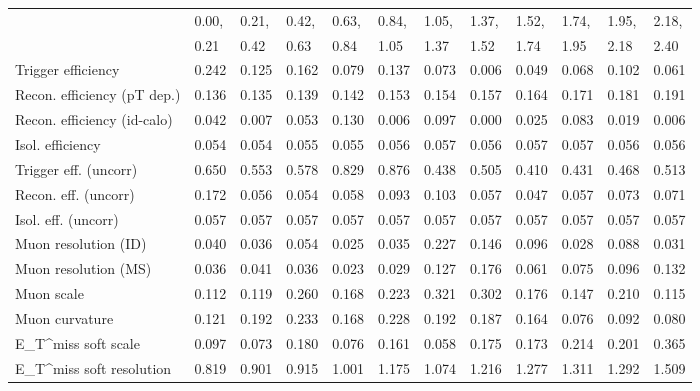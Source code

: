 \begin{tabular}{l|p{0.6cm}p{0.6cm}p{0.6cm}p{0.6cm}p{0.6cm}p{0.6cm}p{0.6cm}p{0.6cm}p{0.6cm}p{0.6cm}p{0.6cm}}
\hline
   & 0.00, & 0.21, & 0.42, & 0.63, & 0.84, & 1.05, & 1.37, & 1.52, & 1.74, & 1.95, & 2.18,  \\ 
   & 0.21 & 0.42 & 0.63 & 0.84 & 1.05 & 1.37 & 1.52 & 1.74 & 1.95 & 2.18 & 2.40  \\ 
\hline
Trigger efficiency                       & 0.242 & 0.125 & 0.162 & 0.079 & 0.137 & 0.073 & 0.006 & 0.049 & 0.068 & 0.102 & 0.061 \\
Recon. efficiency (pT dep.)              & 0.136 & 0.135 & 0.139 & 0.142 & 0.153 & 0.154 & 0.157 & 0.164 & 0.171 & 0.181 & 0.191 \\
Recon. efficiency (id-calo)              & 0.042 & 0.007 & 0.053 & 0.130 & 0.006 & 0.097 & 0.000 & 0.025 & 0.083 & 0.019 & 0.006 \\
Isol. efficiency                         & 0.054 & 0.054 & 0.055 & 0.055 & 0.056 & 0.057 & 0.056 & 0.057 & 0.057 & 0.056 & 0.056 \\
Trigger eff. (uncorr)                    & 0.650 & 0.553 & 0.578 & 0.829 & 0.876 & 0.438 & 0.505 & 0.410 & 0.431 & 0.468 & 0.513 \\
Recon. eff. (uncorr)                     & 0.172 & 0.056 & 0.054 & 0.058 & 0.093 & 0.103 & 0.057 & 0.047 & 0.057 & 0.073 & 0.071 \\
Isol. eff. (uncorr)                      & 0.057 & 0.057 & 0.057 & 0.057 & 0.057 & 0.057 & 0.057 & 0.057 & 0.057 & 0.057 & 0.057 \\
Muon resolution (ID)                     & 0.040 & 0.036 & 0.054 & 0.025 & 0.035 & 0.227 & 0.146 & 0.096 & 0.028 & 0.088 & 0.031 \\
Muon resolution (MS)                     & 0.036 & 0.041 & 0.036 & 0.023 & 0.029 & 0.127 & 0.176 & 0.061 & 0.075 & 0.096 & 0.132 \\
Muon scale                               & 0.112 & 0.119 & 0.260 & 0.168 & 0.223 & 0.321 & 0.302 & 0.176 & 0.147 & 0.210 & 0.115 \\
Muon curvature                           & 0.121 & 0.192 & 0.233 & 0.168 & 0.228 & 0.192 & 0.187 & 0.164 & 0.076 & 0.092 & 0.080 \\
E_{T}^{miss} soft scale                  & 0.097 & 0.073 & 0.180 & 0.076 & 0.161 & 0.058 & 0.175 & 0.173 & 0.214 & 0.201 & 0.365 \\
E_{T}^{miss} soft resolution             & 0.819 & 0.901 & 0.915 & 1.001 & 1.175 & 1.074 & 1.216 & 1.277 & 1.311 & 1.292 & 1.509 \\

\end{tabular}
